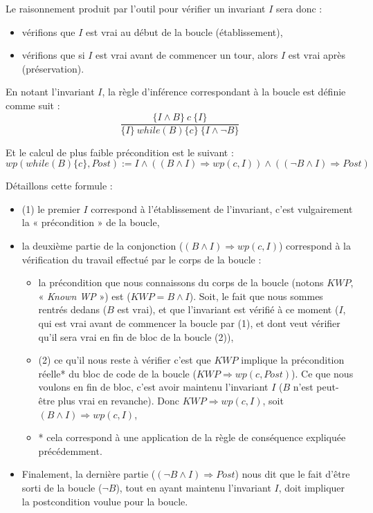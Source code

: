 Le raisonnement produit par l'outil pour vérifier un invariant $I$ sera donc :
\begin{itemize}
\item vérifions que $I$ est vrai au début de la boucle (établissement),
\item vérifions que si $I$ est vrai avant de commencer un tour, alors $I$ est vrai après (préservation).
\end{itemize}




En notant l'invariant $I$, la règle d'inférence correspondant à la boucle est
définie comme suit :
$$\dfrac{\{I \wedge B \}\ c\ \{I\}}{\{I\}\ while(B)\{c\}\ \{I \wedge \neg B\}}$$


Et le calcul de plus faible précondition est le suivant :
$$wp(while (B) \{ c \}, Post) := I \wedge ((B \wedge I) \Rightarrow wp(c, I)) \wedge ((\neg B \wedge I) \Rightarrow Post)$$


Détaillons cette formule :



\begin{itemize}
\item (1) le premier $I$ correspond à l'établissement de l'invariant, c'est
vulgairement la « précondition » de la boucle,
\item la deuxième partie de la conjonction ($(B \wedge I) \Rightarrow wp(c, I)$)
correspond à la vérification du travail effectué par le corps de la boucle :
\begin{itemize}
\item la précondition que nous connaissons du corps de la boucle (notons $KWP$,
« \textit{Known WP} ») est ($KWP = B \wedge I$). Soit, le fait que nous sommes
rentrés dedans ($B$ est vrai), et que l'invariant est vérifié à ce moment
($I$, qui est vrai avant de commencer la boucle par (1), et dont veut
vérifier qu'il sera vrai en fin de bloc de la boucle (2)),
\item (2) ce qu'il nous reste à vérifier c'est que $KWP$ implique la
précondition réelle* du bloc de code de la boucle
  ($KWP \Rightarrow wp(c, Post)$). Ce que nous voulons en fin de bloc,
  c'est avoir maintenu l'invariant $I$ ($B$ n'est peut-être plus vrai en
  revanche). Donc
$KWP \Rightarrow wp(c, I)$, soit $(B \wedge I) \Rightarrow wp(c, I)$,
\item * cela correspond à une application de la règle de conséquence expliquée
précédemment.
\end{itemize}
\item Finalement, la dernière partie ($(\neg B \wedge I) \Rightarrow Post$)
nous dit que le fait d'être sorti de la boucle ($\neg B$), tout en ayant
maintenu l'invariant $I$, doit impliquer la postcondition voulue pour la
boucle.
\end{itemize}


